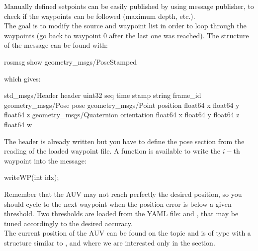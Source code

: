 \documentclass{ecnreport}
\begin{document}
Manually defined setpoints can be easily published by using  message publisher, to check if the waypoints can be followed (maximum depth, etc.).\\

The goal is to modify the source and waypoint list in order to loop through the waypoints (go back to waypoint 0 after the last one was reached).
The structure of the  message can be found with:
\begin{bashcodelarge}
rosmsg show geometry_msgs/PoseStamped
\end{bashcodelarge}
which gives:
\begin{bashcodelarge}
std_msgs/Header header
  uint32 seq
  time stamp
  string frame_id
geometry_msgs/Pose pose
  geometry_msgs/Point position
    float64 x
    float64 y
    float64 z
  geometry_msgs/Quaternion orientation
    float64 x
    float64 y
    float64 z
    float64 w
\end{bashcodelarge}
The header is already written but you have to define the pose section from the reading of the loaded waypoint file.
A function is available to write the $i-$th waypoint into the  message:
\begin{cppcodelarge}
writeWP(int idx);
\end{cppcodelarge}
Remember that the AUV may not reach perfectly the desired position, so you should cycle to the next waypoint when the position error is below a given threshold.
Two thresholds are loaded from the YAML file:  and , that may be tuned accordingly to the desired accuracy.\\
The current position of the AUV can be found on the topic  and is of type  with a structure similar to , and where we are interested only
in the  section.\\


%
\end{document}
